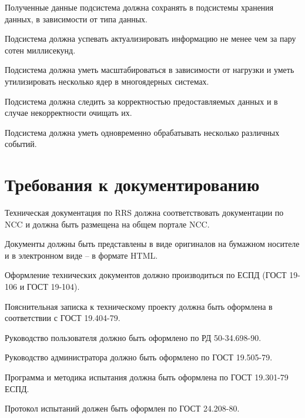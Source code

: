 Полученные данные подсистема должна сохранять в подсистемы хранения данных, в зависимости от типа данных.

Подсистема должна успевать актуализировать информацию не менее чем за пару сотен миллисекунд.

Подсистема должна уметь масштабироваться в зависимости от нагрузки и уметь утилизировать несколько ядер в многоядерных системах.

Подсистема должна следить за корректностью предоставляемых данных и в случае некорректности очищать их.

Подсистема должна уметь одновременно обрабатывать несколько различных событий.

\section{Требования к документированию} %

Техническая документация по RRS должна соответствовать документации по NCC
и должна быть размещена на общем портале NCC.

Документы должны быть представлены в виде оригиналов на бумажном носителе и в электронном виде – в формате HTML\@.

Оформление технических документов должно производиться по ЕСПД (ГОСТ 19-106 и ГОСТ 19-104).

Пояснительная записка к техническому проекту должна быть оформлена в соответствии с ГОСТ 19.404-79.

Руководство пользователя должно быть оформлено по РД 50-34.698-90.

Руководство администратора должно быть оформлено по ГОСТ 19.505-79.

Программа и методика испытания должна быть оформлена по ГОСТ 19.301-79 ЕСПД.

Протокол испытаний должен быть оформлен по ГОСТ 24.208-80.